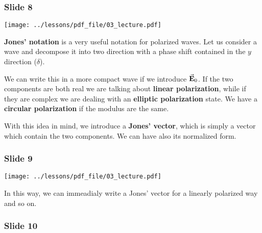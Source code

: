 \documentclass[../main/main.tex]{subfiles}
\begin{document}
\subsubsection*{Slide 8}

\begin{minipage}[]{0.5\linewidth}
\centering
\texttt{[image: ../lessons/pdf\_file/03\_lecture.pdf]}
\end{minipage}
\hspace{0.3cm}\vspace{0.3cm}
\begin{minipage}[c]{0.47\linewidth}

\textbf{Jones' notation} is a very useful notation for polarized waves. Let us consider a wave and decompose it into two direction with a phase shift contained in the \( y \) direction (\( \delta  \)).

We can write this in a more compact wave if we introduce \( \va{E}_0 \).
If the two components are both real we are talking about \textbf{linear polarization}, while if they are complex we are dealing with an \textbf{elliptic polarization} state.
We have a \textbf{circular polarization} if the modulus are the same.

With this idea in mind, we introduce a \textbf{Jones' vector}, which is simply a vector which contain the two components. We can have also its normalized form.


\end{minipage}

\subsubsection*{Slide 9}

\begin{minipage}[]{0.5\linewidth}
\centering
\texttt{[image: ../lessons/pdf\_file/03\_lecture.pdf]}
\end{minipage}
\hspace{0.3cm}\vspace{0.3cm}
\begin{minipage}[c]{0.47\linewidth}

In this way, we can immeadialy write a Jones' vector for a linearly polarized way and so on.



\end{minipage}

\subsubsection*{Slide 10}
\end{document}
